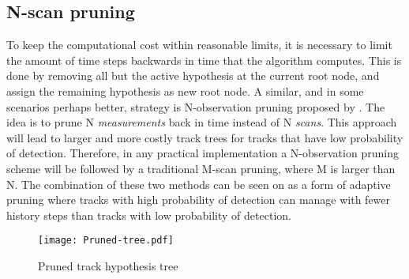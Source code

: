 \subsection{N-scan pruning}
To keep the computational cost within reasonable limits, it is necessary to limit the amount of time steps backwards in time that the algorithm computes. This is done by removing all but the active hypothesis at the current root node, and assign the remaining hypothesis as new root node. A similar, and in some scenarios perhaps better, strategy is N-observation pruning proposed by \cite{Blackman2004}. The idea is to prune N \emph{measurements} back in time instead of N \emph{scans}. This approach will lead to larger and more costly track trees for tracks that have low probability of detection. Therefore, in any practical implementation a N-observation pruning scheme will be followed by a traditional M-scan pruning, where M is larger than N. The combination of these two methods can be seen on as a form of adaptive pruning where tracks with high probability of detection can manage with fewer history steps than tracks with low probability of detection.

\begin{figure}[ht]
\centering
\texttt{[image: Pruned-tree.pdf]}
\caption{Pruned track hypothesis tree}
\label{fig:pruned-hyp-tree}
\end{figure}